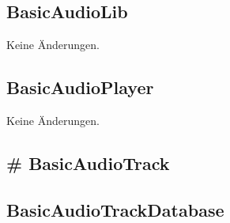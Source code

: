 \documentclass[../implementierung.tex]{subfiles}
\begin{document}
\subsection{BasicAudioLib} Keine Änderungen.
\subsection{BasicAudioPlayer} Keine Änderungen.
\subsection{\# BasicAudioTrack} 
\begin{itemize}
\end{itemize}
\subsection{BasicAudioTrackDatabase}
\end{document}
